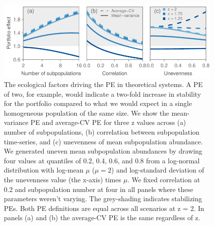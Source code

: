 \clearpage
\begin{figure}[htbp]
  \centering \includegraphics[width=4.8in]{prophets/fig2}
  \caption[The ecological factors driving the PE in theoretical systems.]{
  The ecological factors driving the PE in theoretical systems. A PE of
    two, for example, would indicate a two-fold increase in stability for the
    portfolio compared to what we would expect in a single homogeneous
    population of the same size. We show the mean-variance PE and average-CV PE
    for three z values across (a) number of subpopulations, (b)
    correlation between subpopulation time-series, and (c) unevenness of mean
    subpopulation abundance. We generated uneven mean subpopulation abundances
    by drawing four values at quantiles of 0.2, 0.4, 0.6, and 0.8
    from a log-normal distribution
    with log-mean $\mu$ ($\mu = 2$) and log-standard deviation of the
    unevenness value (the x-axis) times $\mu$. We fixed correlation at 0.2 and subpopulation
    number at four in all panels where these parameters weren't varying. The
    grey-shading indicates stabilizing PEs. Both PE definitions are equal
    across all scenarios at z = 2. In panels (a) and (b) the average-CV PE is
    the same regardless of z.
  } \label{fig:lines}
\end{figure}

